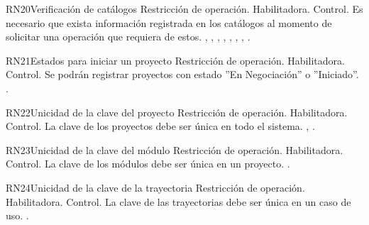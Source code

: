 \begin{BussinesRule}{RN20}{Verificación de catálogos} 
	\BRitem[Tipo:] Restricción de operación. 
	\BRitem[Clase:] Habilitadora. 
	\BRitem[Nivel:] Control. %
	\BRitem[Descripción:] Es necesario que exista información registrada en los catálogos al momento de solicitar una operación que requiera de estos.
	 , , , , , , , . 
\end{BussinesRule}


\begin{BussinesRule}{RN21}{Estados para iniciar un proyecto} 
	\BRitem[Tipo:] Restricción de operación. 
	\BRitem[Clase:] Habilitadora. 
	\BRitem[Nivel:] Control. %
	\BRitem[Descripción:] Se podrán registrar proyectos con estado ''En Negociación'' o ''Iniciado''.
	 \UCref{}{}. 
\end{BussinesRule}

\begin{BussinesRule}{RN22}{Unicidad de la clave del proyecto} 
	\BRitem[Tipo:] Restricción de operación. 
	\BRitem[Clase:] Habilitadora. 
	\BRitem[Nivel:] Control. %
	\BRitem[Descripción:] La clave de los proyectos debe ser única en todo el sistema.
	 , . 
\end{BussinesRule}

\begin{BussinesRule}{RN23}{Unicidad de la clave del módulo} 
	\BRitem[Tipo:] Restricción de operación. 
	\BRitem[Clase:] Habilitadora. 
	\BRitem[Nivel:] Control. %
	\BRitem[Descripción:] La clave de los módulos debe ser única en un proyecto.
	 . 
\end{BussinesRule}

\begin{BussinesRule}{RN24}{Unicidad de la clave de la trayectoria} 
	\BRitem[Tipo:] Restricción de operación. 
	\BRitem[Clase:] Habilitadora. 
	\BRitem[Nivel:] Control. %
	\BRitem[Descripción:] La clave de las trayectorias debe ser única en un caso de uso.
	 \UCref{}{}. 
\end{BussinesRule}

